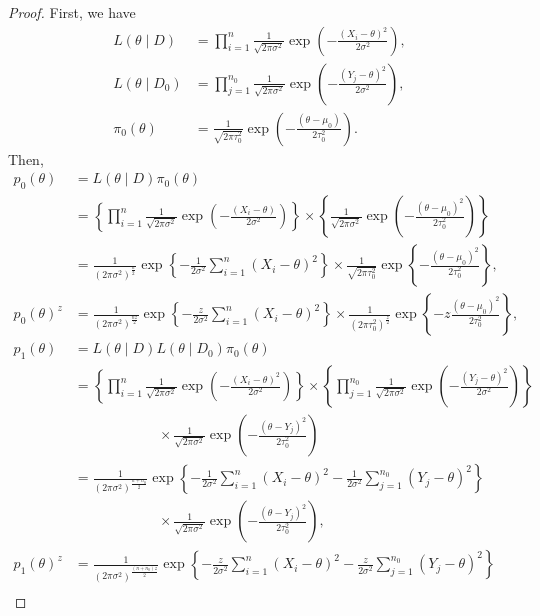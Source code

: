 \documentclass[12pt]{article}
\begin{document}
\begin{proof}
   First, we have
   \begin{align*}
       L(\theta \mid D) &= \prod^n_{i=1}\frac{1}{\sqrt{2\pi\sigma^2}}\exp\left(-\frac{(X_i - \theta)^2}{2\sigma^2}\right), \\
       L(\theta \mid D_0) &= \prod^{n_0}_{j=1}\frac{1}{\sqrt{2\pi\sigma^2}}\exp\left(-\frac{(Y_j - \theta)^2}{2\sigma^2}\right), \\
       \pi_0(\theta) &= \frac{1}{\sqrt{2\pi\tau_0^2}}\exp\left(-\frac{(\theta - \mu_0)}{2\tau_0^2}\right).
   \end{align*}
   Then,
   \begin{align*}
       p_0(\theta) &= L(\theta \mid D)\pi_0(\theta) \\
       &= \left\{\prod^n_{i=1}\frac{1}{\sqrt{2\pi\sigma^2}}\exp\left(-\frac{(X_i - \theta)}{2\sigma^2}\right)\right\} \times \left\{\frac{1}{\sqrt{2\pi\sigma^2}}\exp\left(-\frac{(\theta - \mu_0)^2}{2\tau_0^2}\right)\right\} \\
       &= \frac{1}{(2\pi\sigma^2)^{\frac{n}{2}}}\exp\left\{-\frac{1}{2\sigma^2}\sum^n_{i=1}(X_i - \theta)^2 \right\} \times \frac{1}{\sqrt{2\pi\tau_0^2}}\exp\left\{-\frac{(\theta - \mu_0)^2}{2\tau_0^2}\right\}, \\
       p_0(\theta)^z &= \frac{1}{(2\pi\sigma^2)^{\frac{nz}{2}}}\exp\left\{-\frac{z}{2\sigma^2}\sum^n_{i=1}(X_i - \theta)^2 \right\} \times \frac{1}{(2\pi\tau_0^2)^{\frac{z}{2}}}\exp\left\{-z\frac{(\theta - \mu_0)^2}{2\tau_0^2}\right\}, \\
       p_1(\theta) &= L(\theta \mid D)L(\theta \mid D_0)\pi_0(\theta) \\
       &= \left\{\prod^n_{i=1}\frac{1}{\sqrt{2\pi\sigma^2}}\exp\left(-\frac{(X_i - \theta)^2}{2\sigma^2}\right)\right\} \times \left\{\prod^{n_0}_{j=1}\frac{1}{\sqrt{2\pi\sigma^2}}\exp\left(-\frac{(Y_j - \theta)^2}{2\sigma^2}\right)\right\} \\
       &\quad\quad\quad\quad\quad\quad \times \frac{1}{\sqrt{2\pi\sigma^2}}\exp\left(-\frac{(\theta - Y_j)^2}{2\tau_0^2}\right) \\
       &= \frac{1}{(2\pi\sigma^2)^{\frac{n + n_0}{2}}}\exp\left\{-\frac{1}{2\sigma^2}\sum^n_{i=1}(X_i - \theta)^2 - \frac{1}{2\sigma^2}\sum^{n_0}_{j=1}(Y_j - \theta)^2\right\} \\
       &\quad\quad\quad\quad\quad\quad \times \frac{1}{\sqrt{2\pi\sigma^2}}\exp\left(-\frac{(\theta - Y_j)^2}{2\tau_0^2}\right), \\
       p_1(\theta)^z &= \frac{1}{(2\pi\sigma^2)^{\frac{(n + n_0)z}{2}}}\exp\left\{-\frac{z}{2\sigma^2}\sum^n_{i=1}(X_i - \theta)^2 - \frac{z}{2\sigma^2}\sum^{n_0}_{j=1}(Y_j - \theta)^2\right\} \\

\end{align*}
\end{proof}
\end{document}
